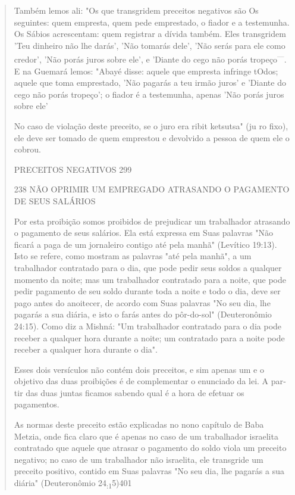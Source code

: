 \begin{quote}
Também lemos ali: "Os que transgridem preceitos negativos são Os
seguintes: quem empresta, quem pede emprestado, o fiador e a testemunha.
Os Sábios acrescentam: quem registrar a dívida também. Eles transgridem
'Teu dinheiro não lhe darás', 'Não tomarás dele', 'Não serás para ele
como credor', 'Não porás juros sobre ele', e 'Diante do cego não porás
tropeço\textsuperscript{---}. E na Gue­mará lemos: "Abayé disse: aquele
que empresta infringe tOdos; aquele que to­ma emprestado, 'Não pagarás a
teu irmão juros' e 'Diante do cego não porás tropeço'; o fiador é a
testemunha, apenas 'Não porás juros sobre ele'

No caso de violação deste preceito, se o juro era ribit ketsutsa" (ju ro
fixo), ele deve ser tomado de quem emprestou e devolvido a pessoa de
quem ele o cobrou.

PRECEITOS NEGATIVOS 299

238 NÃO OPRIMIR UM EMPREGADO ATRASANDO O PAGAMENTO DE SEUS SALÁRIOS

Por esta proibição somos proibidos de prejudicar um trabalhador
atra­sando o pagamento de seus salários. Ela está expressa em Suas
palavras "Não ficará a paga de um jornaleiro contigo até pela manhã"
(Levítico 19:13). Isto se refere, como mostram as palavras "até pela
manhã", a um trabalhador con­tratado para o dia, que pode pedir seus
soldos a qualquer momento da noite; mas um trabalhador contratado para a
noite, que pode pedir pagamento de seu soldo durante toda a noite e todo
o dia, deve ser pago antes do anoitecer, de acordo com Suas palavras "No
seu dia, lhe pagarás a sua diária, e isto o farás antes do pôr-do-sol"
(Deuteronômio 24:15). Como diz a Mishná: "Um traba­lhador contratado
para o dia pode receber a qualquer hora durante a noite; um contratado
para a noite pode receber a qualquer hora durante o dia".

Esses dois versículos não contém dois preceitos, e sim apenas um e o
objetivo das duas proibições é de complementar o enunciado da lei. A
par­tir das duas juntas ficamos sabendo qual é a hora de efetuar os
pagamentos.

As normas deste preceito estão explicadas no nono capítulo de Baba
Metzia, onde fica claro que é apenas no caso de um trabalhador israelita
contra­tado que aquele que atrasar o pagamento do soldo viola um
preceito negativo; no caso de um trabalhador não israelita, ele
transgride um preceito positivo, contido em Suas palavras "No seu dia,
lhe pagarás a sua diária" (Deuteronômio 24\textsubscript{:1}5)401


\end{quote}
